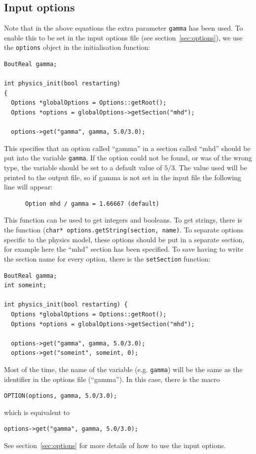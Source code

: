 \documentclass[12pt]{article}
\newcommand{\code}[1]{\texttt{#1}}
\begin{document}
\subsection{Input options}
\label{sec:inputopts}
Note that in the above equations the extra parameter \code{gamma} has been used. To enable this to be set
in the input options file (see section~\ref{sec:options}), we use the \code{options} object in the
initialisation function:
\begin{lstlisting}
BoutReal gamma;

int physics_init(bool restarting)
{
  Options *globalOptions = Options::getRoot();
  Options *options = globalOptions->getSection("mhd");

  options->get("gamma", gamma, 5.0/3.0);
\end{lstlisting}
This specifies that an option called ``gamma'' in a section called ``mhd'' should be put into the variable \code{gamma}. If the option could not be found, or was of the wrong type, the variable should be set to a default value of $5/3$.
The value used will be printed to the output file, so if gamma is not set in the input file the following line will appear:
\begin{verbatim}
      Option mhd / gamma = 1.66667 (default)
\end{verbatim}
This function can be used to get integers and booleans. To get strings, there
is the function (\code{char* options.getString(section, name)}.
To separate options specific to the physics model, these options should be put in a separate
section, for example here the ``mhd'' section has been specified. To save having to write the section name for every option, there is the \code{setSection} function:
\begin{lstlisting}
BoutReal gamma;
int someint;

int physics_init(bool restarting) {
  Options *globalOptions = Options::getRoot();
  Options *options = globalOptions->getSection("mhd");

  options->get("gamma", gamma, 5.0/3.0);
  options->get("someint", someint, 0);
\end{lstlisting}
Most of the time, the name of the variable (e.g. \code{gamma}) will be
the same as the identifier in the options file (``gamma''). In this case,
there is the macro
\begin{lstlisting}[numbers=none]
OPTION(options, gamma, 5.0/3.0);
\end{lstlisting}
which is equivalent to
\begin{lstlisting}[numbers=none]
options->get("gamma", gamma, 5.0/3.0);
\end{lstlisting}
See section~\ref{sec:options} for more details of how to use the input options.
\end{document}
